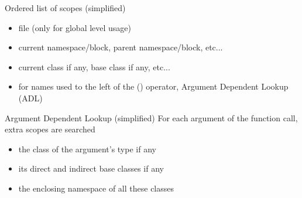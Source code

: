 \begin{frame}
  \begin{block}{Ordered list of scopes (simplified)}
    \begin{itemize}
    \item file (only for global level usage)
    \item current namespace/block, parent namespace/block, etc...
    \item current class if any, base class if any, etc...
    \item for names used to the left of the () operator, Argument Dependent Lookup (ADL)
    \end{itemize}
  \end{block}
  \begin{exampleblock}{Argument Dependent Lookup (simplified)}
    For each argument of the function call, extra scopes are searched
    \begin{itemize}
    \item the class of the argument's type if any
    \item its direct and indirect base classes if any
    \item the enclosing namespace of all these classes
    \end{itemize}
  \end{exampleblock}
\end{frame}

